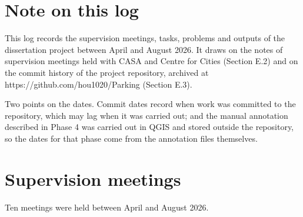 \hypertarget{note-on-this-log}{%
\section{Note on this log}\label{note-on-this-log}}

This log records the supervision meetings, tasks, problems and outputs of the dissertation project between April and August 2026. It draws on the notes of supervision meetings held with CASA and Centre for Cities (Section E.2) and on the commit history of the project repository, archived at https://github.com/hou1020/Parking (Section E.3).

Two points on the dates. Commit dates record when work was committed to the repository, which may lag when it was carried out; and the manual annotation described in Phase 4 was carried out in QGIS and stored outside the repository, so the dates for that phase come from the annotation files themselves.

\hypertarget{supervision-meetings}{%
\section{Supervision meetings}\label{supervision-meetings}}

Ten meetings were held between April and August 2026.

